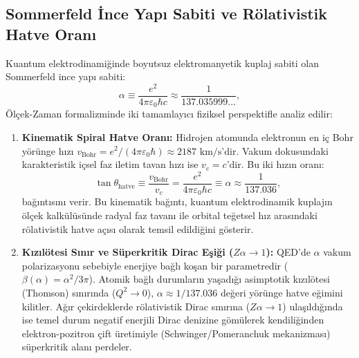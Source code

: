 \subsection{Sommerfeld İnce Yapı Sabiti ve Rölativistik Hatve Oranı}
\label{sec:alpha_main}
Kuantum elektrodinamiğinde boyutsuz elektromanyetik kuplaj sabiti olan Sommerfeld ince yapı sabiti:
\begin{equation}
    \alpha \equiv \frac{e^2}{4\pi \varepsilon_0 \hbar c} \approx \frac{1}{137.035999...},
\end{equation}
Ölçek-Zaman formalizminde iki tamamlayıcı fiziksel perspektifle analiz edilir:
\begin{enumerate}
    \item \textbf{Kinematik Spiral Hatve Oranı:} Hidrojen atomunda elektronun en iç Bohr yörünge hızı $v_{\mathrm{Bohr}} = e^2 / (4\pi \varepsilon_0 \hbar) \approx 2187\text{ km/s}$'dir. Vakum dokusundaki karakteristik içsel faz iletim tavan hızı ise $v_c = c$'dir. Bu iki hızın oranı:
          \begin{equation}
              \tan\theta_{\mathrm{hatve}} \equiv \frac{v_{\mathrm{Bohr}}}{v_c} = \frac{e^2}{4\pi \varepsilon_0 \hbar c} \equiv \alpha \approx \frac{1}{137.036},
          \end{equation}
          bağıntısını verir. Bu kinematik bağıntı, kuantum elektrodinamik kuplajın ölçek kalkülüsünde radyal faz tavanı ile orbital teğetsel hız arasındaki rölativistik hatve açısı olarak temsil edildiğini gösterir.
    \item \textbf{Kızılötesi Sınır ve Süperkritik Dirac Eşiği ($Z\alpha \to 1$):} QED'de $\alpha$ vakum polarizasyonu sebebiyle enerjiye bağlı koşan bir parametredir ($\beta(\alpha) = \alpha^2/3\pi$). Atomik bağlı durumların yaşadığı asimptotik kızılötesi (Thomson) sınırında ($Q^2 \to 0$), $\alpha \approx 1/137.036$ değeri yörünge hatve eğimini kilitler. Ağır çekirdeklerde rölativistik Dirac sınırına ($Z\alpha \to 1$) ulaşıldığında ise temel durum negatif enerjili Dirac denizine gömülerek kendiliğinden elektron-pozitron çift üretimiyle (Schwinger/Pomeranchuk mekanizması) süperkritik alanı perdeler.
\end{enumerate}

